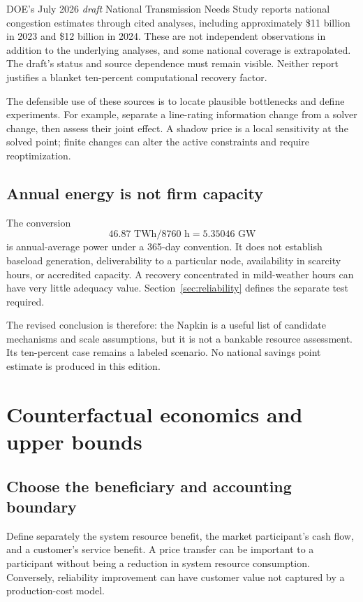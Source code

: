 \documentclass[11pt,letterpaper]{article}
\begin{document}
DOE's July 2026 \emph{draft} National Transmission Needs Study reports national congestion estimates through cited analyses, including approximately \$11 billion in 2023 and \$12 billion in 2024. These are not independent observations in addition to the underlying analyses, and some national coverage is extrapolated. The draft's status and source dependence must remain visible.\cite{doe} Neither report justifies a blanket ten-percent computational recovery factor.

The defensible use of these sources is to locate plausible bottlenecks and define experiments. For example, separate a line-rating information change from a solver change, then assess their joint effect. A shadow price is a local sensitivity at the solved point; finite changes can alter the active constraints and require reoptimization.

\subsection{Annual energy is not firm capacity}
The conversion
\[
 46.87\text{ TWh}/8760\text{ h}=5.35046\text{ GW}
\]
is annual-average power under a 365-day convention. It does not establish baseload generation, deliverability to a particular node, availability in scarcity hours, or accredited capacity. A recovery concentrated in mild-weather hours can have very little adequacy value. Section~\ref{sec:reliability} defines the separate test required.

The revised conclusion is therefore: the Napkin is a useful list of candidate mechanisms and scale assumptions, but it is not a bankable resource assessment. Its ten-percent case remains a labeled scenario. No national savings point estimate is produced in this edition.

\section{Counterfactual economics and upper bounds}
\label{sec:economics}
\subsection{Choose the beneficiary and accounting boundary}
Define separately the system resource benefit, the market participant's cash flow, and a customer's service benefit. A price transfer can be important to a participant without being a reduction in system resource consumption. Conversely, reliability improvement can have customer value not captured by a production-cost model.
\end{document}
